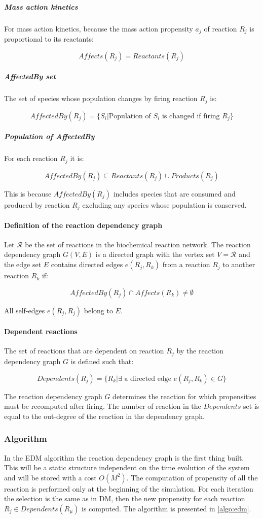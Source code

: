         \subparagraph{Mass action kinetics}
        For mass action kinetics, because the mass action propensity $a_j$ of reaction $R_j$ is proportional to its reactants:

        $$Affects(R_j) = Reactants(R_j)$$

        \subparagraph{AffectedBy set}
        The set of species whose population changes by firing reaction $R_j$ is:

        $$AffectedBy(R_j) = \{S_i|\text{Population of }S_i\text{ is changed if firing }R_j\}$$

        \subparagraph{Population of AffectedBy}
        For each reaction $R_j$ it is:

        $$AffectedBy(R_j)\subseteq Reactants(R_j)\cup Products(R_j)$$

        This is because $AffectedBy(R_j)$ includes species that are consumed and produced by reaction $R_j$ excluding any species whose population is conserved.

      \paragraph{Definition of the reaction dependency graph}
      Let $\mathcal{R}$ be the set of reactions in the biochemical reaction network.
      The reaction dependency graph $G(V, E)$ is a directed graph with the vertex set $V = \mathcal{R}$ and the edge set $E$ contains directed edges $e(R_j, R_k)$ from a reaction $R_j$ to another reaction $R_k$ if:

      $$AffectedBy(R_j)\cap Affects(R_k)\neq\emptyset$$

      All self-edges $e(R_j, R_j)$ belong to $E$.

      \paragraph{Dependent reactions}
      The set of reactions that are dependent on reaction $R_j$ by the reaction dependency graph $G$ is defined such that:

      $$Dependents(R_j) = \{R_k|\exists\text{ a directed edge }e(R_j,R_k)\in G\}$$

      The reaction dependency graph $G$ determines the reaction for which propensities must be recomputed after firing.
      The number of reaction in the $Dependents$ set is equal to the out-degree of the reaction in the dependency graph.

    \subsubsection{Algorithm}
    In the EDM algorithm the reaction dependency graph is the first thing built.
    This will be a static structure independent on the time evolution of the system and will be stored with a cost $O(M^2)$.
    The computation of propensity of all the reaction is performed only at the beginning of the simulation.
    For each iteration the selection is the same as in DM, then the new propensity for each reaction $R_j\in Dependents(R_\mu)$ is computed.
    The algorithm is presented in \ref{algo:edm}.

